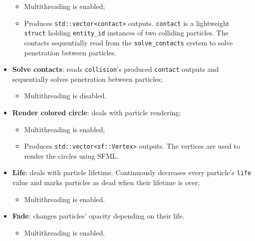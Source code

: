 \documentclass[oneside, 12pt, a4paper, openany]{book}
\providecommand{\tightlist}{%
  \setlength{\itemsep}{0pt}\setlength{\parskip}{0pt}}
\begin{document}
\begin{itemize}
  \begin{itemize}
  \item
    Multithreading is enabled;
  \item
    Produces
    \texttt{std::vector<contact>}
    outputs.
    \texttt{contact}
    is a lightweight
    \texttt{struct}
    holding
    \texttt{entity_id}
    instances of two colliding particles. The contacts sequentially read
    from the
    \texttt{solve_contacts}
    system to solve penetration between particles.
  \end{itemize}
\item
  \textbf{Solve contacts}: reads
  \texttt{collision}'s
  produced
  \texttt{contact}
  outputs and sequentially solves penetration between particles;

  \begin{itemize}
  \tightlist
  \item
    Multithreading is disabled.
  \end{itemize}
\item
  \textbf{Render colored circle}: deals with particle rendering;

  \begin{itemize}
  \item
    Multithreading is enabled;
  \item
    Produces
    \texttt{std::vector<sf::Vertex>}
    outputs. The vertices are used to render the circles using SFML.
  \end{itemize}
\item
  \textbf{Life}: deals with particle lifetime. Continuously decreases
  every particle's
  \texttt{life}
  value and marks particles as dead when their lifetime is over;

  \begin{itemize}
  \tightlist
  \item
    Multithreading is enabled.
  \end{itemize}
\item
  \textbf{Fade}: changes particles' opacity depending on their life.

  \begin{itemize}
  \tightlist
  \item
    Multithreading is enabled.
  \end{itemize}
\end{itemize}
\end{document}
